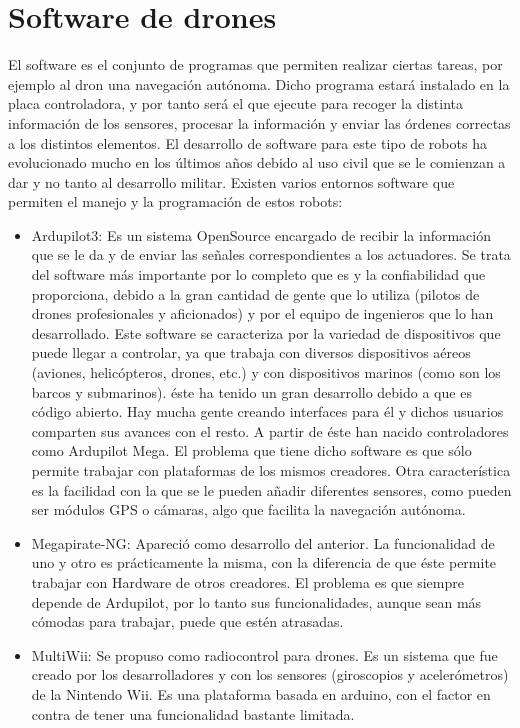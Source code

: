 \section{Software de drones}

El software es el conjunto de programas que permiten realizar ciertas tareas, por
ejemplo al dron una navegación autónoma. Dicho programa estará instalado en la
placa controladora, y por tanto será el que ejecute para recoger la distinta información
de los sensores, procesar la información y enviar las órdenes correctas a los distintos
elementos. El desarrollo de software para este tipo de robots ha evolucionado mucho
en los últimos años debido al uso civil que se le comienzan a dar y no tanto al desarrollo
militar. Existen varios entornos software que permiten el manejo y la programación de
estos robots:
\begin{itemize}
\item Ardupilot3: Es un sistema OpenSource encargado de recibir la información
que se le da y de enviar las señales correspondientes a los actuadores. Se
trata del software más importante por lo completo que es y la confiabilidad que
proporciona, debido a la gran cantidad de gente que lo utiliza (pilotos de drones
profesionales y aficionados) y por el equipo de ingenieros que lo han desarrollado.
Este software se caracteriza por la variedad de dispositivos que puede llegar a
controlar, ya que trabaja con diversos dispositivos aéreos (aviones, helicópteros,
drones, etc.) y con dispositivos marinos (como son los barcos y submarinos). éste
ha tenido un gran desarrollo debido a que es código abierto. Hay mucha gente
creando interfaces para él y dichos usuarios comparten sus avances con el resto.
A partir de éste han nacido controladores como Ardupilot Mega. El problema
que tiene dicho software es que sólo permite trabajar con plataformas de los
mismos creadores. Otra característica es la facilidad con la que se le pueden
añadir diferentes sensores, como pueden ser módulos GPS o cámaras, algo que
facilita la navegación autónoma.
\item Megapirate-NG: Apareció como desarrollo del anterior. La funcionalidad de
uno y otro es prácticamente la misma, con la diferencia de que éste permite
trabajar con Hardware de otros creadores. El problema es que siempre depende
de Ardupilot, por lo tanto sus funcionalidades, aunque sean más cómodas para
trabajar, puede que estén atrasadas.
\item MultiWii: Se propuso como radiocontrol para drones. Es un sistema que fue
creado por los desarrolladores y con los sensores (giroscopios y acelerómetros) de
la Nintendo Wii. Es una plataforma basada en arduino, con el factor en contra
de tener una funcionalidad bastante limitada.

\end{itemize}

